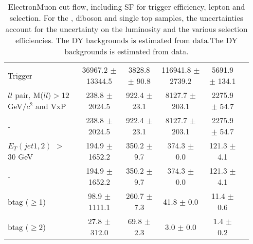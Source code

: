 \documentclass[amsmath,amssymb]{revtex4}
\begin{document}
\begin{landscape}
\begin{table}[p]
\begin{tabular}{|l|c|c|c|c|c|}
Trigger & 36967.2 $\pm$ 13344.5 & 3828.8 $\pm$ 90.8 & 116941.8 $\pm$ 2739.2 & 5691.9 $\pm$ 134.1 \\
$ll$ pair, M($ll$)$>$12 GeV$/c^2$ and VxP & 238.8 $\pm$ 2024.5 & 922.4 $\pm$ 23.1 & 8127.7 $\pm$ 203.1 & 2275.9 $\pm$ 54.7 \\
 -  & 238.8 $\pm$ 2024.5 & 922.4 $\pm$ 23.1 & 8127.7 $\pm$ 203.1 & 2275.9 $\pm$ 54.7 \\
$E_T(jet1,2)$ $>$ 30 GeV & 194.9 $\pm$ 1652.2 & 350.2 $\pm$ 9.7 & 374.3 $\pm$ 0.0 & 121.3 $\pm$ 4.1 \\
 -  & 194.9 $\pm$ 1652.2 & 350.2 $\pm$ 9.7 & 374.3 $\pm$ 0.0 & 121.3 $\pm$ 4.1 \\
btag ($\ge$1) & 98.9 $\pm$ 1111.1 & 260.7 $\pm$ 7.3 & 41.8 $\pm$ 0.0 & 11.4 $\pm$ 0.6 \\
btag ($\ge$2) & 27.8 $\pm$ 312.0 & 69.8 $\pm$ 2.3 & 3.0 $\pm$ 0.0 & 1.4 $\pm$ 0.2 \\
\hline 
\hline
\end{tabular}
\caption{ ElectronMuon cut flow, including SF for trigger efficiency, lepton and \met selection. For the \ttbar, diboson and single top samples, the uncertainties account for the uncertainty on the luminosity and the various selection efficiencies. The DY backgrounds is estimated from data.The DY backgrounds is estimated from data.  }
\label{Table:CutFlow_emu}
\end{table}
\end{landscape}
\end{document}
